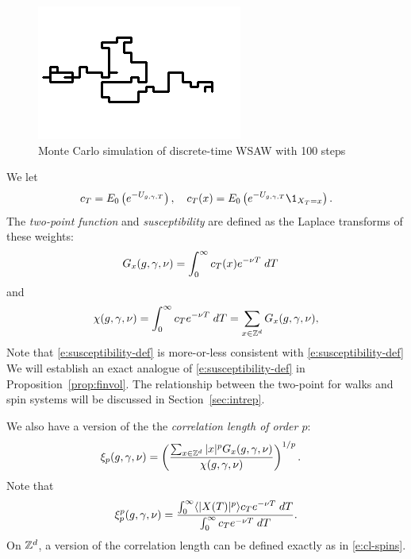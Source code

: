 \begin{figure}[!htb]
\centering
\label{fig:domb-joyce}
\includegraphics{domb-joyce-black-small.png}
\caption{Monte Carlo simulation of discrete-time WSAW with 100 steps}
\end{figure}

We let
\begin{equation}
\label{e:c}
c_T = E_0\left(e^{-U_{\gcc,\gamma,T}}\right),
	\quad
c_T(x) = E_0\left(e^{-U_{\gcc,\gamma,T}}\1_{X_T = x}\right).
\end{equation}
The \emph{two-point function} and \emph{susceptibility} are defined
as the Laplace transforms of these weights:
\begin{align}
\lbeq{Gsa}
G_x(\gcc,\gamma,\nu)
    &=
\int_0^\infty c_T(x) e^{-\nu T} \; dT
\end{align}
and
\begin{equation}
\label{e:suscept-def}
\chi(g, \gamma, \nu)
	=
\int_0^\infty c_T e^{-\nu T} \; dT
	=
\sum_{x\in{ {{\mathbb Z}}^d }} G_x(g,\gamma,\nu),
\end{equation}
Note that \eqref{e:susceptibility-def} is more-or-less consistent with \eqref{e:susceptibility-def}
We will establish an exact analogue of \eqref{e:susceptibility-def} in Proposition~\ref{prop:finvol}.
The relationship between the two-point for walks and spin systems will be
discussed in Section~\ref{sec:intrep}.

We also have a version of the the \emph{correlation length of order $p$}:
\begin{align}
\label{e:clp-wsawsa}
\xi_p(g, \gamma, \nu)
	&=
\left(\frac{\sum_{x\in{ {{\mathbb Z}}^d }} |x|^p G_x(g, \gamma, \nu)}{\chi(g, \gamma, \nu)}\right)^{1/p}.
\end{align}
Note that
\begin{equation}
\xi_p^p(g,\gamma,\nu)
	=
\frac
{\int_0^\infty \langle |X(T)|^p \rangle c_T e^{-\nu T} \; dT}
{\int_0^\infty c_T e^{-\nu T} \; dT}.
\end{equation}
On ${ {{\mathbb Z}}^d }$, a version of the correlation length can be defined exactly as in \eqref{e:cl-spins}.

